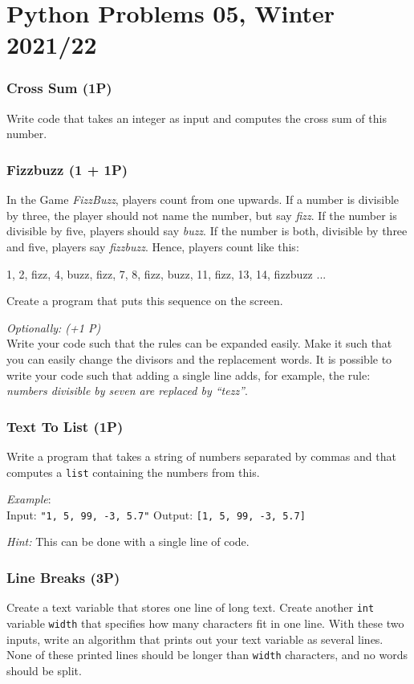 \documentclass[
	english,
	fontsize=10pt,
	parskip=half,
	titlepage=true,
	DIV=12
]{scrartcl}
\newcommand*{\inPy}[1]{\texttt{#1}}
\begin{document}
\part*{Python Problems 05, Winter 2021/22}
\section{Cross Sum (1\;P)}
Write code that takes an integer as input and computes the cross sum of this number.


\section{Fizzbuzz (1 + 1\;P)}
In the Game \emph{FizzBuzz}, players count from one upwards. If a number is divisible by three, the player should not name the number, but say \emph{fizz}. If the number is divisible by five, players should say \emph{buzz}. If the number is both, divisible by three and five, players say \emph{fizzbuzz}. Hence, players count like this:
\begin{center}
	1, 2, fizz, 4, buzz, fizz, 7, 8, fizz, buzz, 11, fizz, 13, 14, fizzbuzz ...
\end{center}

Create a program that puts this sequence on the screen.

\emph{Optionally: (+1 P)}\\
Write your code such that the rules can be expanded easily. Make it such that you can easily change the divisors and the replacement words. It is possible to write your code such that adding a single line adds, for example, the rule: \emph{numbers divisible by seven are replaced by \enquote{tezz}}.


\section{Text To List (1\;P)}
Write a program that takes a string of numbers separated by commas and that computes a \inPy{list} containing the numbers from this.

\emph{Example}:\\
Input: \inPy{"1, 5, 99, -3, 5.7"} \tab
Output: \inPy{[1, 5, 99, -3, 5.7]}

\emph{Hint:} This can be done with a single line of code.


\section{Line Breaks (3\;P)}
Create a text variable that stores one line of long text. Create another \inPy{int} variable \texttt{width} that specifies how many characters fit in one line. With these two inputs, write an algorithm that prints out your text variable as several lines. None of these printed lines should be longer than \texttt{width} characters, and no words should be split.
\end{document}
